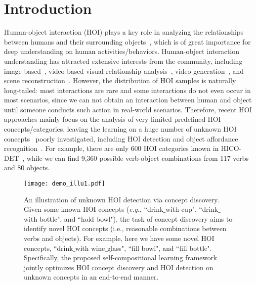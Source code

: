 \documentclass[runningheads]{llncs}
\newcommand{\eg}{\textit{e.g.}}
\begin{document}
\section{Introduction}
\label{sec:intro}


Human-object interaction (HOI) plays a key role in analyzing the relationships between humans and their surrounding objects~\cite{gupta2009observing}, which is of great importance for deep understanding on human activities/behaviors. Human-object interaction understanding has attracted extensive interests from the community, including image-based~\cite{chaoy2015hico,chaoy2018learning,gao2018ican,liao2019ppdm,tamura_cvpr2021}, video-based visual relationship analysis~\cite{damen2018scaling1,materzynska2020something}, video generation~\cite{nawhal2020generating}, and  scene reconstruction~\cite{zhang2020phosa}. However, the distribution of HOI samples is naturally long-tailed: most interactions are rare and some interactions do not even occur in most scenarios, since we can not obtain an interaction between human and object until someone conducts such action in real-world scenarios. Therefore, recent HOI approaches mainly focus on the analysis of very limited predefined HOI concepts/categories, leaving the learning on a huge number of unknown HOI concepts~\cite{coren2003sensation,best1986cognitive}  poorly investigated, including HOI detection and object affordance recognition~\cite{shen2018scaling,hou2020visual,hou2021atl}. For example, there are only 600 HOI categories known in HICO-DET~\cite{chao2018learning}, while we can find 9,360 possible verb-object combinations from $117$ verbs and $80$ objects.


\begin{figure}
  \centering
  \texttt{[image: demo\_illu1.pdf]}
  \caption{An illustration of unknown HOI detection via  concept discovery. Given some known HOI concepts (\eg, ``drink$\_$with cup", ``drink$\_$with bottle", and ``hold bowl"), the task of concept discovery aims to identify novel HOI concepts (i.e., reasonable combinations between verbs and objects). For example, here we have some novel HOI concepts, ``drink$\_$with wine$\_$glass", ``fill bowl", and ``fill bottle". Specifically, the proposed self-compositional learning framework jointly optimizes HOI concept discovery and HOI detection on unknown concepts in an end-to-end manner.
  }
  \label{fig:concpet}
\end{figure}
\end{document}
